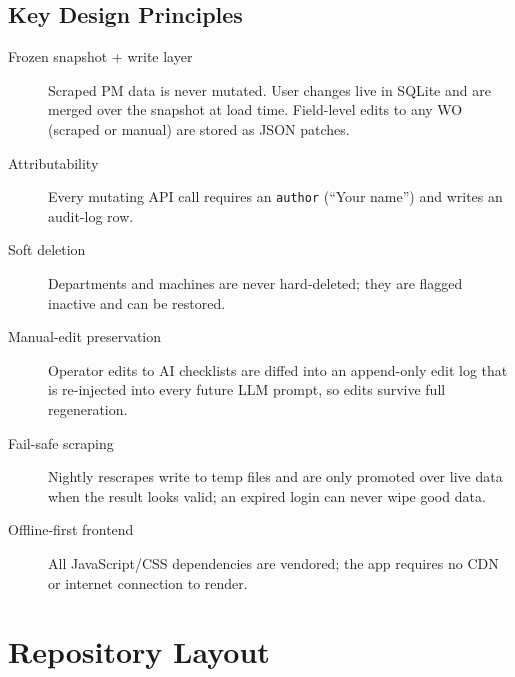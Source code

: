 \documentclass[11pt,a4paper]{article}
\newcommand{\code}[1]{\texttt{#1}}
\begin{document}
\subsection{Key Design Principles}
\begin{description}
    \item[Frozen snapshot + write layer] Scraped PM data is never mutated.
          User changes live in SQLite and are merged over the snapshot at
          load time. Field-level edits to any WO (scraped or manual) are
          stored as JSON patches.
    \item[Attributability] Every mutating API call requires an
          \code{author} (``Your name'') and writes an audit-log row.
    \item[Soft deletion] Departments and machines are never hard-deleted;
          they are flagged inactive and can be restored.
    \item[Manual-edit preservation] Operator edits to AI checklists are
          diffed into an append-only edit log that is re-injected into every
          future LLM prompt, so edits survive full regeneration.
    \item[Fail-safe scraping] Nightly rescrapes write to temp files and are
          only promoted over live data when the result looks valid; an
          expired login can never wipe good data.
    \item[Offline-first frontend] All JavaScript/CSS dependencies are
          vendored; the app requires no CDN or internet connection to
          render.
\end{description}

\section{Repository Layout}
\end{document}
